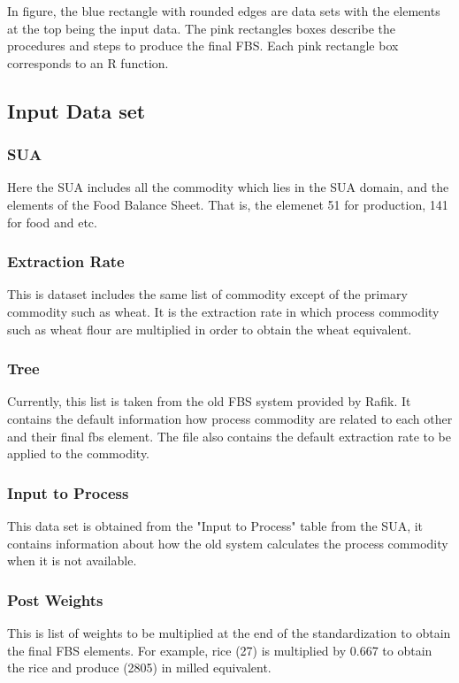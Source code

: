 \documentclass{article}
\begin{document}
In figure, the blue rectangle with rounded edges are data sets with
the elements at the top being the input data. The pink rectangles
boxes describe the procedures and steps to produce the final FBS. Each
pink rectangle box corresponds to an R function.



\subsection{Input Data set}

\subsubsection{SUA}

Here the SUA includes all the commodity which lies in the SUA domain,
and the elements of the Food Balance Sheet. That is, the elemenet 51
for production, 141 for food and etc.

\subsubsection{Extraction Rate}
This is dataset includes the same list of commodity except of the
primary commodity such as wheat. It is the extraction rate in which
process commodity such as wheat flour are multiplied in order to
obtain the wheat equivalent.

\subsubsection{Tree}
Currently, this list is taken from the old FBS system provided by
Rafik. It contains the default information how process commodity are
related to each other and their final fbs element. The file also
contains the default extraction rate to be applied to the commodity.

\subsubsection{Input to Process}

This data set is obtained from the "Input to Process" table from the
SUA, it contains information about how the old system calculates the
process commodity when it is not available.

\subsubsection{Post Weights}
This is list of weights to be multiplied at the end of the
standardization to obtain the final FBS elements. For example, rice
(27) is multiplied by 0.667 to obtain the rice and produce (2805) in
milled equivalent.
\end{document}
